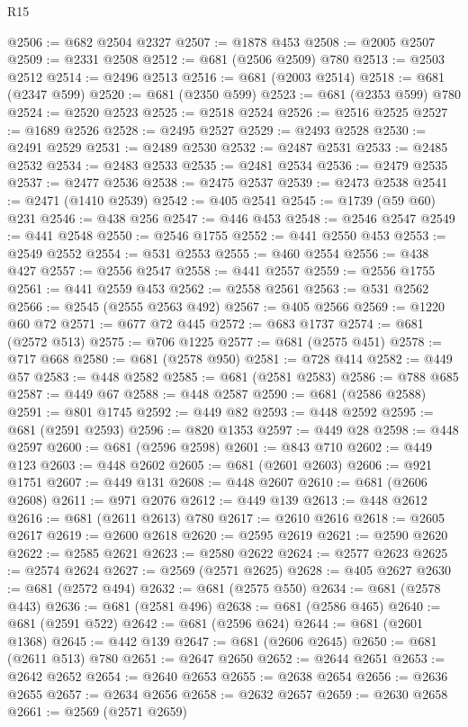 \begin{lexlean}{R15}
\begin{coremodule}
@2506 := @682 @2504 @2327
@2507 := @1878 @453
@2508 := @2005 @2507
@2509 := @2331 @2508
@2512 := @681 (@2506 @2509) @780
@2513 := @2503 @2512
@2514 := @2496 @2513
@2516 := @681 (@2003 @2514)
@2518 := @681 (@2347 @599)
@2520 := @681 (@2350 @599)
@2523 := @681 (@2353 @599) @780
@2524 := @2520 @2523
@2525 := @2518 @2524
@2526 := @2516 @2525
@2527 := @1689 @2526
@2528 := @2495 @2527
@2529 := @2493 @2528
@2530 := @2491 @2529
@2531 := @2489 @2530
@2532 := @2487 @2531
@2533 := @2485 @2532
@2534 := @2483 @2533
@2535 := @2481 @2534
@2536 := @2479 @2535
@2537 := @2477 @2536
@2538 := @2475 @2537
@2539 := @2473 @2538
@2541 := @2471 (@1410 @2539)
@2542 := @405 @2541
@2545 := @1739 (@59 @60) @231
@2546 := @438 @256
@2547 := @446 @453
@2548 := @2546 @2547
@2549 := @441 @2548
@2550 := @2546 @1755
@2552 := @441 @2550 @453
@2553 := @2549 @2552
@2554 := @531 @2553
@2555 := @460 @2554
@2556 := @438 @427
@2557 := @2556 @2547
@2558 := @441 @2557
@2559 := @2556 @1755
@2561 := @441 @2559 @453
@2562 := @2558 @2561
@2563 := @531 @2562
@2566 := @2545 (@2555 @2563 @492)
@2567 := @405 @2566
@2569 := @1220 @60 @72
@2571 := @677 @72 @445
@2572 := @683 @1737
@2574 := @681 (@2572 @513)
@2575 := @706 @1225
@2577 := @681 (@2575 @451)
@2578 := @717 @668
@2580 := @681 (@2578 @950)
@2581 := @728 @414
@2582 := @449 @57
@2583 := @448 @2582
@2585 := @681 (@2581 @2583)
@2586 := @788 @685
@2587 := @449 @67
@2588 := @448 @2587
@2590 := @681 (@2586 @2588)
@2591 := @801 @1745
@2592 := @449 @82
@2593 := @448 @2592
@2595 := @681 (@2591 @2593)
@2596 := @820 @1353
@2597 := @449 @28
@2598 := @448 @2597
@2600 := @681 (@2596 @2598)
@2601 := @843 @710
@2602 := @449 @123
@2603 := @448 @2602
@2605 := @681 (@2601 @2603)
@2606 := @921 @1751
@2607 := @449 @131
@2608 := @448 @2607
@2610 := @681 (@2606 @2608)
@2611 := @971 @2076
@2612 := @449 @139
@2613 := @448 @2612
@2616 := @681 (@2611 @2613) @780
@2617 := @2610 @2616
@2618 := @2605 @2617
@2619 := @2600 @2618
@2620 := @2595 @2619
@2621 := @2590 @2620
@2622 := @2585 @2621
@2623 := @2580 @2622
@2624 := @2577 @2623
@2625 := @2574 @2624
@2627 := @2569 (@2571 @2625)
@2628 := @405 @2627
@2630 := @681 (@2572 @494)
@2632 := @681 (@2575 @550)
@2634 := @681 (@2578 @443)
@2636 := @681 (@2581 @496)
@2638 := @681 (@2586 @465)
@2640 := @681 (@2591 @522)
@2642 := @681 (@2596 @624)
@2644 := @681 (@2601 @1368)
@2645 := @442 @139
@2647 := @681 (@2606 @2645)
@2650 := @681 (@2611 @513) @780
@2651 := @2647 @2650
@2652 := @2644 @2651
@2653 := @2642 @2652
@2654 := @2640 @2653
@2655 := @2638 @2654
@2656 := @2636 @2655
@2657 := @2634 @2656
@2658 := @2632 @2657
@2659 := @2630 @2658
@2661 := @2569 (@2571 @2659)

\end{coremodule}
\end{lexlean}
